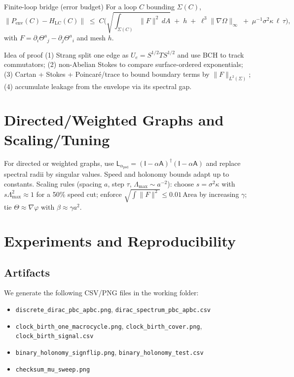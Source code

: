 \documentclass[11pt]{article}
\newcommand{\Id}{\mathsf{I}}
\newcommand{\Lap}{\mathsf{L}_{\alpha}}
\newcommand{\Adj}{\mathsf{A}}
\newcommand{\Thet}{\Theta}
\begin{document}
\begin{mythm}{Finite-loop bridge (error budget)}
For a loop $C$ bounding $\Sigma(C)$,
\begin{equation}
\|P_{\mathrm{env}}(C)-H_{\mathrm{LC}}(C)\|
\;\le\; C\Big(\sqrt{\textstyle\int_{\Sigma(C)}\!\!\|F\|^2\,dA}\;+\;h\;+\;\ell^3\|\nabla\Omega\|_\infty
\;+\;\mu^{-1}\sigma^2\kappa\,\ell\,\tau\Big),
\end{equation}
with $F=\partial_i\Thet^a{}_j-\partial_j\Thet^a{}_i$ and mesh $h$.
\end{mythm}

\begin{proofbox}{Idea of proof}
(1) Strang split one edge as $U_e=S^{1/2}TS^{1/2}$ and use BCH to track commutators;
(2) non-Abelian Stokes to compare surface-ordered exponentials; (3) Cartan + Stokes +
Poincar\'e/trace to bound boundary terms by $\|F\|_{L^2(\Sigma)}$; (4) accumulate leakage
from the envelope via its spectral gap.
\end{proofbox}

\section{Directed/Weighted Graphs and Scaling/Tuning}
For directed or weighted graphs, use $\Lap_{\mathrm{psd}}=(\Id-\alpha \Adj)^\dagger(\Id-\alpha \Adj)$
and replace spectral radii by singular values. Speed and holonomy bounds adapt up to constants.
Scaling rules (spacing $a$, step $\tau$, $\Lambda_{\max}\!\sim\!a^{-2}$): choose
$s=\sigma^2\kappa$ with $s\Lambda_{\max}^2\approx 1$ for a 50\% speed cut; enforce
$\sqrt{\int\|F\|^2}\le 0.01\,\mathrm{Area}$ by increasing $\gamma$; tie $\Thet\approx\nabla\varphi$
with $\beta\approx \gamma a^2$.

\section{Experiments and Reproducibility}
\subsection*{Artifacts}
We generate the following CSV/PNG files in the working folder:
\begin{itemize}
\item \texttt{discrete\_dirac\_pbc\_apbc.png}, \texttt{dirac\_spectrum\_pbc\_apbc.csv}
\item \texttt{clock\_birth\_one\_macrocycle.png}, \texttt{clock\_birth\_cover.png}, \texttt{clock\_birth\_signal.csv}
\item \texttt{binary\_holonomy\_signflip.png}, \texttt{binary\_holonomy\_test.csv}
\item \texttt{checksum\_mu\_sweep.png}
\end{itemize}
\end{document}
